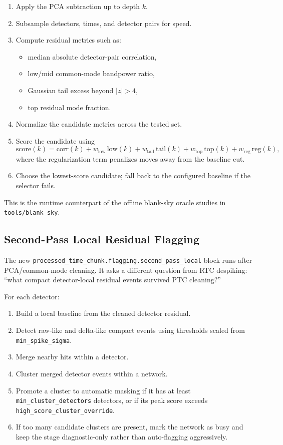 \documentclass[11pt]{article}
\begin{document}
\begin{enumerate}[leftmargin=1.5em]
\item Apply the PCA subtraction up to depth \(k\).
\item Subsample detectors, times, and detector pairs for speed.
\item Compute residual metrics such as:
\begin{itemize}[leftmargin=1.5em]
\item median absolute detector-pair correlation,
\item low/mid common-mode bandpower ratio,
\item Gaussian tail excess beyond \(|z|>4\),
\item top residual mode fraction.
\end{itemize}
\item Normalize the candidate metrics across the tested set.
\item Score the candidate using
\[
\mathrm{score}(k) =
\mathrm{corr}(k)
 + w_{\mathrm{low}} \, \mathrm{low}(k)
 + w_{\mathrm{tail}} \, \mathrm{tail}(k)
 + w_{\mathrm{top}} \, \mathrm{top}(k)
 + w_{\mathrm{reg}} \, \mathrm{reg}(k),
\]
where the regularization term penalizes moves away from the baseline cut.
\item Choose the lowest-score candidate; fall back to the configured baseline
if the selector fails.
\end{enumerate}

This is the runtime counterpart of the offline blank-sky oracle studies in
\texttt{tools/blank\_sky}.

\subsection{Second-Pass Local Residual Flagging}

The new \texttt{processed\_time\_chunk.flagging.second\_pass\_local} block runs
after PCA/common-mode cleaning. It asks a different question from RTC despiking:
``what compact detector-local residual events survived PTC cleaning?''

For each detector:

\begin{enumerate}[leftmargin=1.5em]
\item Build a local baseline from the cleaned detector residual.
\item Detect raw-like and delta-like compact events using thresholds scaled
from \texttt{min\_spike\_sigma}.
\item Merge nearby hits within a detector.
\item Cluster merged detector events within a network.
\item Promote a cluster to automatic masking if it has at least
\texttt{min\_cluster\_detectors} detectors, or if its peak score exceeds
\texttt{high\_score\_cluster\_override}.
\item If too many candidate clusters are present, mark the network as busy and
keep the stage diagnostic-only rather than auto-flagging aggressively.
\end{enumerate}
\end{document}
